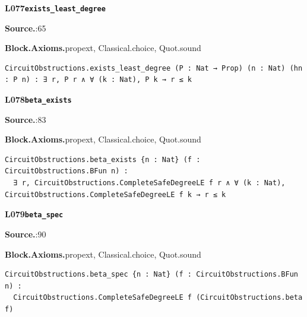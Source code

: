 \par\medskip\noindent\begin{minipage}{\textwidth}
{\small\bfseries L077\enspace\texttt{exists\_least\_degree}\par}
{\footnotesize\raggedright\textbf{Source.}\enspace{}:65\par
\textbf{Block.}\quad\textbf{Axioms.}\enspace propext, Classical.choice, Quot.sound\par}\nopagebreak
\begin{lstlisting}
CircuitObstructions.exists_least_degree (P : Nat → Prop) (n : Nat) (hn : P n) : ∃ r, P r ∧ ∀ (k : Nat), P k → r ≤ k
\end{lstlisting}
\end{minipage}\par

\par\medskip\noindent\begin{minipage}{\textwidth}
{\small\bfseries L078\enspace\texttt{beta\_exists}\par}
{\footnotesize\raggedright\textbf{Source.}\enspace{}:83\par
\textbf{Block.}\quad\textbf{Axioms.}\enspace propext, Classical.choice, Quot.sound\par}\nopagebreak
\begin{lstlisting}
CircuitObstructions.beta_exists {n : Nat} (f : CircuitObstructions.BFun n) :
  ∃ r, CircuitObstructions.CompleteSafeDegreeLE f r ∧ ∀ (k : Nat), CircuitObstructions.CompleteSafeDegreeLE f k → r ≤ k
\end{lstlisting}
\end{minipage}\par

\par\medskip\noindent\begin{minipage}{\textwidth}
{\small\bfseries L079\enspace\texttt{beta\_spec}\par}
{\footnotesize\raggedright\textbf{Source.}\enspace{}:90\par
\textbf{Block.}\quad\textbf{Axioms.}\enspace propext, Classical.choice, Quot.sound\par}\nopagebreak
\begin{lstlisting}
CircuitObstructions.beta_spec {n : Nat} (f : CircuitObstructions.BFun n) :
  CircuitObstructions.CompleteSafeDegreeLE f (CircuitObstructions.beta f)
\end{lstlisting}
\end{minipage}\par

